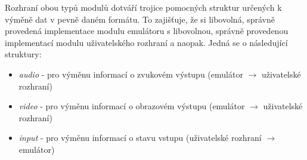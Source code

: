 Rozhraní obou typů modulů dotváří trojice pomocných struktur určených k výměně
dat v pevně daném formátu. To zajišťuje, že si libovolná, správně provedená
implementace modulu emulátoru  s libovolnou, správně
provedenou implementací modulu uživatelského rozhraní a naopak. Jedná se o
následující struktury:

\begin{itemize}
\item {\it audio} - pro výměnu informací o zvukovém výstupu (emulátor
	$\rightarrow$ uživatelské rozhraní)
\item {\it video} - pro výměnu informací o obrazovém výstupu (emulátor
	$\rightarrow$ uživatelské rozhraní)
\item {\it input} - pro výměnu informací o stavu vstupu (uživatelské rozhraní
	$\rightarrow$ emulátor)
\end{itemize}
